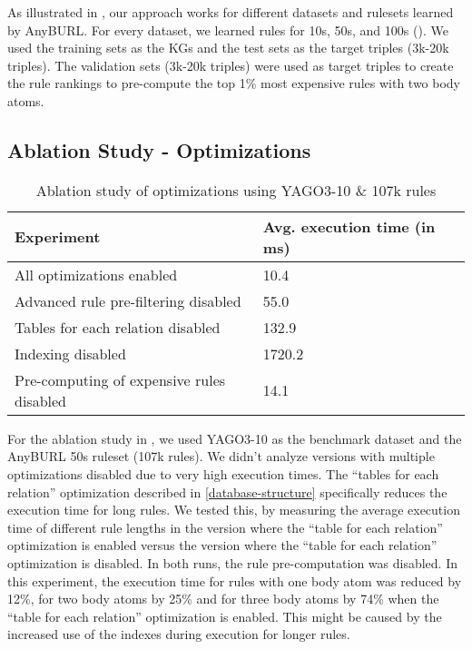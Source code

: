 \documentclass[english]{lni}
\begin{document}
As illustrated in , our approach works for different datasets and rulesets learned by AnyBURL. For every dataset, we learned rules for 10s, 50s, and 100s (). We used the training sets as the KGs and the test sets as the target triples (3k-20k triples). The validation sets (3k-20k triples) were used as target triples to create the rule rankings to pre-compute the top 1\% most expensive rules with two body atoms.

\subsection{Ablation Study - Optimizations} 

\begin{table}[t]
\centering
\begin{tabular}{lll}
\toprule
Experiment & Avg. execution time (in ms) \\
\midrule
All optimizations enabled & 10.4\\
\midrule
Advanced rule pre-filtering disabled & 55.0\\
Tables for each relation disabled & 132.9\\
Indexing disabled & 1720.2\\
Pre-computing of expensive rules disabled & 14.1\\

\bottomrule
\end{tabular}
\caption{Ablation study of optimizations using YAGO3-10 \& 107k rules}
\label{tab:ablation}
\end{table}


For the ablation study in , we used YAGO3-10 as the benchmark dataset and the AnyBURL 50s ruleset (107k rules). We didn't analyze versions with multiple optimizations disabled due to very high execution times. The “tables for each relation” optimization described in \ref{database-structure} specifically reduces the execution time for long rules. We tested this, by measuring the average execution time of different rule lengths in the version where the “table for each relation” optimization is enabled versus the version where the “table for each relation” optimization is disabled. In both runs, the rule pre-computation was disabled. In this experiment, the execution time for rules with one body atom was reduced by 12\%, for two body atoms by 25\% and for three body atoms by 74\% when the “table for each relation” optimization is enabled. This might be caused by the increased use of the indexes during execution for longer rules.
\end{document}
